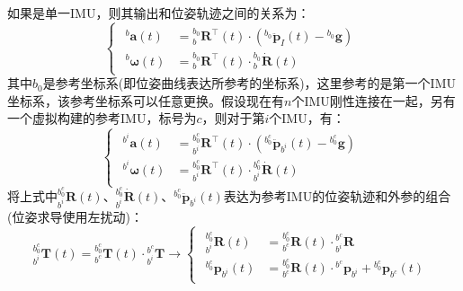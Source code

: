 \documentclass[12pt, onecolumn]{article}
\newcommand\normf{\fangsong}
\begin{document}
	\section{\normf{多IMU因子}}
	\normf
	如果是单一IMU，则其输出和位姿轨迹之间的关系为：
	\begin{equation}
	\label{equ:imu_bspline}
	\begin{cases}
	\begin{aligned}
	{^{b}\boldsymbol{a}(t)}&={^{b_0}_{b}\boldsymbol{R}^\top(t)}\cdot({^{b_0}\ddot{\boldsymbol{p}}_I(t)}-{^{b_0}\boldsymbol{g}})\\
	{^{b}\boldsymbol{\omega}(t)}&={^{b_0}_{b}\boldsymbol{R}^\top(t)}\cdot{^{b_0}_{b}\dot{\boldsymbol{R}}(t)}
	\end{aligned}
	\end{cases}
	\end{equation}
	其中$b_0$是参考坐标系(即位姿曲线表达所参考的坐标系)，这里参考的是第一个IMU坐标系，该参考坐标系可以任意更换。假设现在有$n$个IMU刚性连接在一起，另有一个虚拟构建的参考IMU，标号为$c$，则对于第$i$个IMU，有：
	\begin{equation}
	\begin{cases}
	\begin{aligned}
	{^{b^i}\boldsymbol{a}(t)}&={^{b^c_0}_{b^i}\boldsymbol{R}^\top(t)}\cdot({^{b^c_0}\ddot{\boldsymbol{p}}_{b^i}(t)}-{^{b^c_0}\boldsymbol{g}})
	\\
	{^{b^i}\boldsymbol{\omega}(t)}&={^{b^c_0}_{b^i}\boldsymbol{R}^\top(t)}\cdot{^{b^c_0}_{b^i}\dot{\boldsymbol{R}}(t)}
	\end{aligned}
	\end{cases}
	\end{equation}
	将上式中${^{b^c_0}_{b^i}\boldsymbol{R}(t)}$、${^{b^c_0}_{b^i}\dot{\boldsymbol{R}}(t)}$、${^{b^c_0}\ddot{\boldsymbol{p}}_{b^i}(t)}$表达为参考IMU的位姿轨迹和外参的组合(位姿求导使用左扰动)：
	\begin{equation}
	{^{b^c_0}_{b^i}\boldsymbol{T}(t)}={^{b^c_0}_{b^c}\boldsymbol{T}(t)}\cdot{^{b^c}_{b^i}\boldsymbol{T}}\to
	\begin{cases}
	\begin{aligned}
	{^{b^c_0}_{b^i}\boldsymbol{R}(t)}&={^{b^c_0}_{b^c}\boldsymbol{R}(t)}\cdot{^{b^c}_{b^i}\boldsymbol{R}}\\
	{^{b^c_0}\boldsymbol{p}_{b^i}(t)}&={^{b^c_0}_{b^c}\boldsymbol{R}(t)}\cdot{^{b^c}\boldsymbol{p}_{b^i}}+{^{b^c_0}\boldsymbol{p}_{b^c}(t)}
	\end{aligned}
	\end{cases}
	\end{equation}
\end{document}
